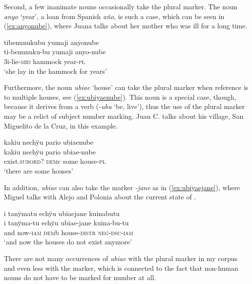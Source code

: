Second, a few inanimate nouns occasionally take the plural marker. The noun \textit{anyo} ‘year’, a loan from Spanish \textit{año}, is such a case, which can be seen in (\ref{ex:anyonube}), where Juana talks about her mother who was ill for a long time.

\ea\label{ex:anyonube}
\begingl 
\glpreamble tibenunukubu yumaji anyonube\\
\gla ti-benunuku-bu yumaji anyo-nube\\ 
\glb 3i-lie-\textsc{mid} hammock year-\textsc{pl}\\ 
\glft ‘she lay in the hammock for years’
\trailingcitation{[jxx-p120430l-2.501]}
\xe

Furthermore, the noun \textit{ubiae} ‘house’ can take the plural marker when reference is to multiple houses, see (\ref{ex:ubiyaenube}). This noun is a special case, though, because it derives from a verb (\textit{-ubu} ‘be, live’), thus the use of the plural marker may be a relict of subject number marking. Juan C. talks about his village, San Miguelito de la Cruz, in this example.

\ea\label{ex:ubiyaenube}
\begingl 
\glpreamble kakiu nechÿu pario ubiaenube\\
\gla kakiu nechÿu pario ubiae-nube\\ 
\glb exist.\textsc{subord}? \textsc{dem}c some house-\textsc{pl}\\ 
\glft ‘there are some houses’
\trailingcitation{[mqx-p110826l.182]}%
\xe

In addition, \textit{ubiae} can also take the  marker \textit{-jane} as in (\ref{ex:ubiyaejane}), where Miguel talks with Alejo and Polonia about the current state of .

\ea\label{ex:ubiyaejane}
\begingl 
\glpreamble i tanÿmatu echÿu ubiaejane kuinabutu\\
\gla i tanÿma-tu echÿu ubiae-jane kuina-bu-tu\\ 
\glb and now-\textsc{iam} \textsc{dem}b house-\textsc{distr} \textsc{neg}-\textsc{dsc}-\textsc{iam}\\ 
\glft ‘and now the houses do not exist anymore’
\trailingcitation{[mty-p110906l.200-201]}
\xe

There are not many occurrences of \textit{ubiae} with the plural marker in my corpus and even less with the  marker, which is connected to the fact that non-human nouns do not have to be marked for number at all. 

